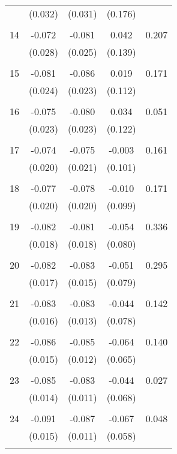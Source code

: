 \begin{tabular}{l*{1}{cccc}}
          & (0.032) & (0.031) & (0.176) & \\
 & & & &\\
  14       & -0.072 & -0.081 & 0.042 & 0.207 \\
          & (0.028) & (0.025) & (0.139) & \\
 & & & &\\
  15       & -0.081 & -0.086 & 0.019 & 0.171 \\
          & (0.024) & (0.023) & (0.112) & \\
 & & & &\\
  16       & -0.075 & -0.080 & 0.034 & 0.051 \\
          & (0.023) & (0.023) & (0.122) & \\
 & & & &\\
  17       & -0.074 & -0.075 & -0.003 & 0.161 \\
          & (0.020) & (0.021) & (0.101) & \\
 & & & &\\
  18       & -0.077 & -0.078 & -0.010 & 0.171 \\
          & (0.020) & (0.020) & (0.099) & \\
 & & & &\\
  19       & -0.082 & -0.081 & -0.054 & 0.336 \\
          & (0.018) & (0.018) & (0.080) & \\
 & & & &\\
  20       & -0.082 & -0.083 & -0.051 & 0.295 \\
          & (0.017) & (0.015) & (0.079) & \\
 & & & &\\
  21       & -0.083 & -0.083 & -0.044 & 0.142 \\
          & (0.016) & (0.013) & (0.078) & \\
 & & & &\\
  22       & -0.086 & -0.085 & -0.064 & 0.140 \\
          & (0.015) & (0.012) & (0.065) & \\
 & & & &\\
  23       & -0.085 & -0.083 & -0.044 & 0.027 \\
          & (0.014) & (0.011) & (0.068) & \\
 & & & &\\
  24       & -0.091 & -0.087 & -0.067 & 0.048 \\
          & (0.015) & (0.011) & (0.058) & \\
 & & & &\\

\end{tabular}
